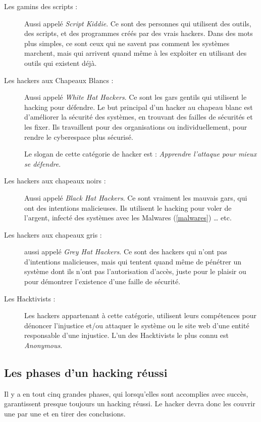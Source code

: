     \begin{description}
        \item[Les gamins des scripts :] Aussi appelé \emph{Script Kiddie}. 
            Ce sont des personnes qui utilisent des outils, des scripts, et des programmes
            créés par des vrais hackers. Dans des mots plus simples, ce sont ceux qui ne savent pas comment 
            les systèmes marchent, mais qui arrivent quand même à les exploiter en utilisant des outils qui 
            existent déjà. %

        \item[Les hackers aux Chapeaux Blancs :] Aussi appelé \emph{White Hat Hackers}.
            Ce sont les gars gentils qui utilisent le hacking pour défendre. 
            Le but principal d'un hacker au chapeau blanc est d'améliorer la sécurité des systèmes, en trouvant
            des failles de sécurités et les fixer. Ils travaillent pour des organisations ou individuellement, pour 
            rendre le cyberespace plus sécurisé. 

            Le slogan de cette catégorie de hacker est : \emph{Apprendre l'attaque pour mieux se défendre}. %
            
        \item[Les hackers aux chapeaux noirs :] Aussi appelé \emph{Black Hat Hackers}.
            Ce sont vraiment les mauvais gars, qui ont des intentions malicieuses. Ils utilisent le hacking 
            pour voler de l'argent, infecté des systèmes avec les Malwares (\autoref{malwares}) \ldots{} etc. %

        \item[Les hackers aux chapeaux gris :] aussi appelé \emph{Grey Hat Hackers}.
            Ce sont des hackers qui n'ont pas d'intentions malicieuses, mais qui tentent quand même de pénétrer 
            un système dont ils n'ont pas l'autorisation d'accès, juste pour le plaisir ou pour démontrer 
            l'existence d'une faille de sécurité. %

        \item[Les Hacktivists :] Les hackers appartenant à cette catégorie, utilisent leurs compétences pour 
            dénoncer l'injustice et/ou attaquer le système ou le site web d'une entité responsable d'une injustice. 
            L'un des Hacktivists le plus connu est \emph{Anonymous}. %
    \end{description}

    \subsection{Les phases d'un hacking réussi}
    Il y a en tout cinq grandes phases, qui lorsqu'elles sont accomplies avec succès, garantissent presque 
    toujours un hacking \cite{bases_hacking} réussi. Le hacker devra donc les couvrir une 
    par une et en tirer des conclusions. %

